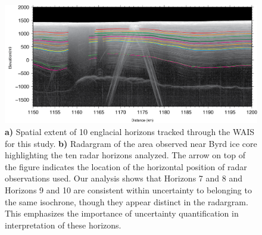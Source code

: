\documentclass[12pt]{article}
\begin{document}
\begin{figure}[!htbp]
\centering
\includegraphics[scale=0.55]{figures/radargram}
\caption[]{\textbf{a)} Spatial extent of 10 englacial horizons tracked through the WAIS for this study. \textbf{b)} Radargram of the area observed near Byrd ice core highlighting the ten radar horizons analyzed. The arrow on top of the figure indicates the location of the horizontal position of radar observations used. Our analysis shows that Horizons 7 and 8 and Horizons 9 and 10 are consistent within uncertainty to belonging to the same isochrone, though they appear distinct in the radargram. This emphasizes the importance of uncertainty quantification in interpretation of these horizons. }
\label{fig:radargram}
\end{figure}
\end{document}
